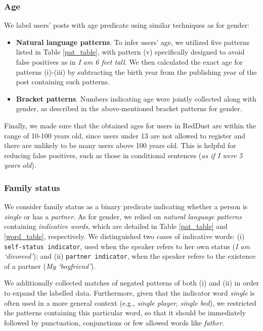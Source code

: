 \subsubsection{Age}
We label users' posts with age predicate using similar techniques as for gender:

\begin{itemize}
    \item \textbf{Natural language patterns}.
    To infer users' age, we utilized five patterns listed in Table \ref{pat_table}, with pattern (v) specifically designed to avoid false positives as in \textit{I am 6 feet tall}.
    We then calculated the exact age for patterns (i)-(iii) by subtracting the birth year from the publishing year of the post containing such patterns.

    \item \textbf{Bracket patterns}.
    Numbers indicating age were jointly collected along with gender, as described in the above-mentioned bracket patterns for gender.
\end{itemize}

Finally, we made sure that the obtained ages for users in RedDust are within the range of 10-100 years old, since users under 13 are not allowed to register and there are unlikely to be many users above 100 years old.
This is helpful for reducing false positives, such as those in conditional sentences (\textit{as if I were 5 years old}).

\subsubsection{Family status}

We consider family status as a binary predicate indicating whether a person is \emph{single} or has a \emph{partner}. As for gender, we relied on \emph{natural language patterns} containing \emph{indicative words}, which are detailed in Table \ref{pat_table} and \ref{word_table}, respectively. We distinguished two cases of indicative words: (i) \texttt{\small{self-status indicator}}, used when the speaker refers to her own status (\emph{I am `divorced'}); and (ii) \texttt{\small{partner indicator}}, when the speaker refers to the existence of a partner (\emph{My `boyfriend'}).

We additionally collected matches of negated patterns of both (i) and (ii)
in order to expand the labelled data. Furthermore, given that the indicator word \emph{single} is often used in a more general context (e.g., \emph{single player}, \emph{single bed}), we restricted the patterns containing this particular word, so that it should be immediately followed by punctuation, conjunctions or few allowed words like \emph{father}.


